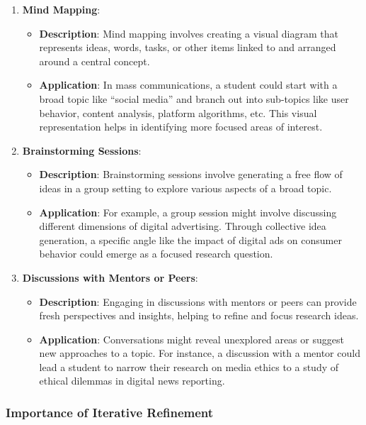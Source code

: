 \documentclass[
]{book}
\providecommand{\tightlist}{%
  \setlength{\itemsep}{0pt}\setlength{\parskip}{0pt}}
\begin{document}
\begin{enumerate}
\def\labelenumi{\arabic{enumi}.}
\tightlist
\item
  \textbf{Mind Mapping}:

  \begin{itemize}
  \tightlist
  \item
    \textbf{Description}: Mind mapping involves creating a visual diagram that represents ideas, words, tasks, or other items linked to and arranged around a central concept.
  \item
    \textbf{Application}: In mass communications, a student could start with a broad topic like ``social media'' and branch out into sub-topics like user behavior, content analysis, platform algorithms, etc. This visual representation helps in identifying more focused areas of interest.
  \end{itemize}
\item
  \textbf{Brainstorming Sessions}:

  \begin{itemize}
  \tightlist
  \item
    \textbf{Description}: Brainstorming sessions involve generating a free flow of ideas in a group setting to explore various aspects of a broad topic.
  \item
    \textbf{Application}: For example, a group session might involve discussing different dimensions of digital advertising. Through collective idea generation, a specific angle like the impact of digital ads on consumer behavior could emerge as a focused research question.
  \end{itemize}
\item
  \textbf{Discussions with Mentors or Peers}:

  \begin{itemize}
  \tightlist
  \item
    \textbf{Description}: Engaging in discussions with mentors or peers can provide fresh perspectives and insights, helping to refine and focus research ideas.
  \item
    \textbf{Application}: Conversations might reveal unexplored areas or suggest new approaches to a topic. For instance, a discussion with a mentor could lead a student to narrow their research on media ethics to a study of ethical dilemmas in digital news reporting.
  \end{itemize}
\end{enumerate}

\hypertarget{importance-of-iterative-refinement}{%
\subsubsection*{Importance of Iterative Refinement}\label{importance-of-iterative-refinement}}
\end{document}
